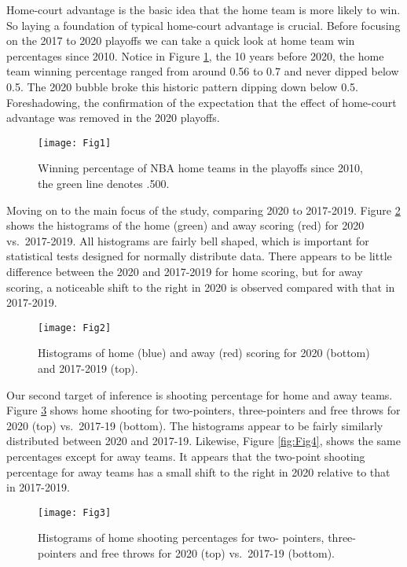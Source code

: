 \documentclass[12pt, letterpaper, titlepage]{article}
\begin{document}
Home-court advantage is the basic idea that the home team is more likely to win.
So laying a foundation of typical home-court advantage is crucial. Before
focusing on the 2017 to 2020 playoffs we can take a quick look at home team win
percentages since 2010. Notice in Figure \ref{fig:Fig1}, the 10 years before 2020, the home team
winning percentage ranged from around 0.56 to 0.7 and never dipped below 0.5. The
2020 bubble broke this historic pattern dipping down below 0.5. Foreshadowing,
the confirmation of the expectation that the effect of home-court advantage was removed
in the 2020 playoffs.

\begin{figure}
  \centering
  \texttt{[image: Fig1]}
  \caption{Winning percentage of NBA home teams in the playoffs since
    2010, the green line denotes .500.}
  \label{fig:Fig1}
\end{figure}

Moving on to the main focus of the study, comparing 2020 to 2017-2019.
Figure \ref{fig:Fig2} shows the histograms of the home (green) and
away scoring (red) for 2020 vs.~2017-2019. All histograms are
fairly bell shaped, which is important for statistical tests
designed for normally distribute data. There appears to be little
difference between the 2020 and 2017-2019 for home scoring, but for
away scoring, a noticeable shift to the right in 2020 is observed
compared with that in 2017-2019.




\begin{figure}
  \centering
  \texttt{[image: Fig2]}
  \caption{Histograms of home (blue) and away (red) scoring
    for 2020 (bottom) and 2017-2019 (top).}
  \label{fig:Fig2}
\end{figure}

Our second target of inference is shooting percentage for home and away teams.
Figure \ref{fig:Fig3} shows home shooting for two-pointers, three-pointers and
free throws for 2020 (top) vs.~2017-19 (bottom). The histograms appear to be fairly
similarly distributed between 2020 and 2017-19. Likewise, Figure \ref{fig:Fig4},
shows the same percentages except for away teams. It appears that the
two-point shooting percentage for away teams has a small shift to the
right in 2020 relative to that in 2017-2019.




\begin{figure}
  \centering
  \texttt{[image: Fig3]}
  \caption{Histograms of home shooting percentages for two-
    pointers, three-pointers and free throws for 2020 (top) vs.~2017-19
    (bottom).}
  \label{fig:Fig3}
\end{figure}
\end{document}
